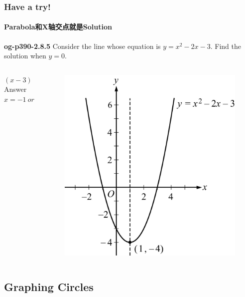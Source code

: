 \documentclass[
	11pt, %
	handout,
]{beamer}
\begin{document}

\begin{frame}
	\frametitle{Have a try!}
	\framesubtitle{Parabola和X轴交点就是Solution}
   \textbf{og-p390-2.8.5} Consider the line whose equation is $y = x^2 - 2x - 3$. Find the solution when $y = 0$.
	\begin{columns}[t] 
		\begin{column}{0.4\textwidth} %
		\pause
		$(x- 3)(x+ 1) = 0$\\
		\bigskip
    Answer \textbf{$x  = -1 \ or \ 3 $}
		\end{column}
		\begin{column}{0.6\textwidth} %
		  \begin{figure}
				\includegraphics[width=0.6\linewidth]{Graphing_Quadratic_Equations.jpg} 
			\end{figure}
    \end{column}
	\end{columns}
\end{frame}



\subsection{Graphing Circles}

\end{document}
